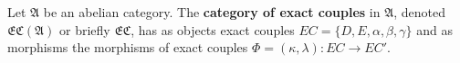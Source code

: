 Let $\mathfrak{A}$ be an abelian category. The \textbf{category of exact couples} in $\mathfrak{A}$, denoted $\mathfrak{EC}(\mathfrak{A})$ or briefly $\mathfrak{EC}$, has as objects exact couples $EC = \{D, E, \alpha, \beta, \gamma\}$ and as morphisms the morphisms of exact couples $\Phi = (\kappa, \lambda): EC \to EC'$.
